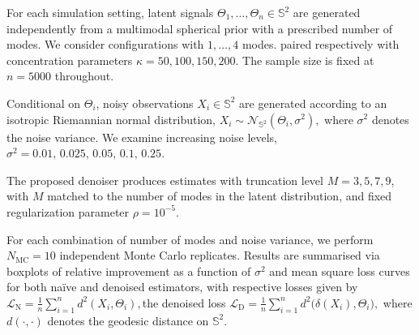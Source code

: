 
For each simulation setting, latent signals $\Theta_1,\ldots,\Theta_n \in \mathbb{S}^2$ are generated independently from a multimodal spherical prior with a prescribed number of modes. We consider configurations with $1,\ldots,4$ modes.
paired respectively with concentration parameters $\kappa = 50,100,150,200$. The sample size is fixed at $n = 5000$ throughout.

Conditional on $\Theta_i$, noisy observations $X_i \in \mathbb{S}^2$ are generated according to an isotropic Riemannian normal distribution,
$
X_i \sim \mathcal{N}_{\mathbb{S}^2}(\Theta_i, \sigma^2),
$
where $\sigma^2$ denotes the noise variance. We examine increasing noise levels,
$
\sigma^2 = 0.01,\,0.025,\,0.05,\,0.1,\,0.25.
$


The proposed denoiser produces estimates with truncation level $M = 3,5,7,9$, 
with $M$ matched to the number of modes in the latent distribution, and fixed regularization parameter $\rho = 10^{-5}$.


For each combination of number of modes and noise variance, we perform $N_{\mathrm{MC}} = 10$ independent Monte Carlo replicates. Results are summarised via boxplots of relative improvement as a function of $\sigma^2$ and mean square loss curves for both naïve and denoised estimators, with respective losses given by
$
\mathcal{L}_{\mathrm{N}}
= \frac{1}{n} \sum_{i=1}^n d^2(X_i, \Theta_i),
$the denoised loss
$
\mathcal{L}_{\mathrm{D}}
= \frac{1}{n} \sum_{i=1}^n d^2\bigl(\delta(X_i), \Theta_i\bigr),
$
where $d(\cdot,\cdot)$ denotes the geodesic distance on $\mathbb{S}^2$.
